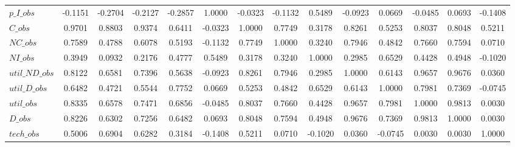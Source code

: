 \begin{center}
\begin{longtable}{lccccccccccccc}
$p\_I\_obs      $	 & 	          -0.1151	 & 	          -0.2704	 & 	          -0.2127	 & 	          -0.2857	 & 	           1.0000	 & 	          -0.0323	 & 	          -0.1132	 & 	           0.5489	 & 	          -0.0923	 & 	           0.0669	 & 	          -0.0485	 & 	           0.0693	 & 	          -0.1408 \\ 
$C\_obs         $	 & 	           0.9701	 & 	           0.8803	 & 	           0.9374	 & 	           0.6411	 & 	          -0.0323	 & 	           1.0000	 & 	           0.7749	 & 	           0.3178	 & 	           0.8261	 & 	           0.5253	 & 	           0.8037	 & 	           0.8048	 & 	           0.5211 \\ 
$NC\_obs        $	 & 	           0.7589	 & 	           0.4788	 & 	           0.6078	 & 	           0.5193	 & 	          -0.1132	 & 	           0.7749	 & 	           1.0000	 & 	           0.3240	 & 	           0.7946	 & 	           0.4842	 & 	           0.7660	 & 	           0.7594	 & 	           0.0710 \\ 
$NI\_obs        $	 & 	           0.3949	 & 	           0.0932	 & 	           0.2176	 & 	           0.4777	 & 	           0.5489	 & 	           0.3178	 & 	           0.3240	 & 	           1.0000	 & 	           0.2985	 & 	           0.6529	 & 	           0.4428	 & 	           0.4948	 & 	          -0.1020 \\ 
$util\_ND\_obs  $	 & 	           0.8122	 & 	           0.6581	 & 	           0.7396	 & 	           0.5638	 & 	          -0.0923	 & 	           0.8261	 & 	           0.7946	 & 	           0.2985	 & 	           1.0000	 & 	           0.6143	 & 	           0.9657	 & 	           0.9676	 & 	           0.0360 \\ 
$util\_D\_obs   $	 & 	           0.6482	 & 	           0.4721	 & 	           0.5544	 & 	           0.7752	 & 	           0.0669	 & 	           0.5253	 & 	           0.4842	 & 	           0.6529	 & 	           0.6143	 & 	           1.0000	 & 	           0.7981	 & 	           0.7369	 & 	          -0.0745 \\ 
$util\_obs      $	 & 	           0.8335	 & 	           0.6578	 & 	           0.7471	 & 	           0.6856	 & 	          -0.0485	 & 	           0.8037	 & 	           0.7660	 & 	           0.4428	 & 	           0.9657	 & 	           0.7981	 & 	           1.0000	 & 	           0.9813	 & 	           0.0030 \\ 
$D\_obs         $	 & 	           0.8226	 & 	           0.6302	 & 	           0.7256	 & 	           0.6482	 & 	           0.0693	 & 	           0.8048	 & 	           0.7594	 & 	           0.4948	 & 	           0.9676	 & 	           0.7369	 & 	           0.9813	 & 	           1.0000	 & 	           0.0030 \\ 
$tech\_obs      $	 & 	           0.5006	 & 	           0.6904	 & 	           0.6282	 & 	           0.3184	 & 	          -0.1408	 & 	           0.5211	 & 	           0.0710	 & 	          -0.1020	 & 	           0.0360	 & 	          -0.0745	 & 	           0.0030	 & 	           0.0030	 & 	           1.0000 \\ 
\end{longtable}
 \end{center}

